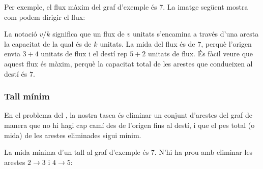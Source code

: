Per exemple, el flux màxim del graf d'exemple és 7. La imatge següent
mostra com podem dirigir el flux:


\begin{center}
\end{center}


La notació $v/k$ significa que un flux de $v$ unitats s'encamina a
través d'una aresta la capacitat de la qual és de $k$ unitats. La mida
del flux és de $7$, perquè l'origen envia $3+4$ unitats de flux i el
destí rep $5+2$ unitats de flux. És fàcil veure que aquest flux és
màxim, perquè la capacitat total de les arestes que condueixen al
destí és $7$.

\subsubsection{Tall mínim}

 

En el problema del , la nostra tasca és eliminar un
conjunt d'arestes del graf de manera que no hi hagi cap camí des de
l'origen fins al destí, i que el pes total (o mida) de les arestes
eliminades sigui mínim.

La mida mínima d'un tall al graf d'exemple és 7. N'hi ha prou amb
eliminar les arestes $2 \rightarrow 3$ i $4 \rightarrow 5$:


